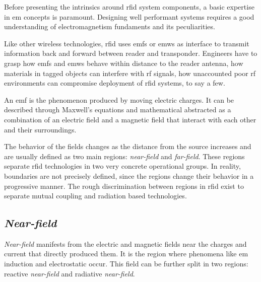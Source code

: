 
Before presenting the intrinsics around \ac{rfid} system components, a basic expertise in \ac{em} concepts is paramount.
Designing well performant systems requires a good understanding of electromagnetism fundaments and its peculiarities.

Like other wireless technologies, \ac{rfid} uses \acp{emf} or \acp{emw} as interface to transmit information back and forward between reader and transponder.
Engineers have to grasp how \acp{emf} and \acp{emw} behave within distance to the reader antenna, how materials in tagged objects can interfere with \ac{rf} signals, how unaccounted poor \ac{rf} environments can compromise deployment of \ac{rfid} systems, to say a few.

An \ac{emf} is the phenomenon produced by moving electric charges. It can be described through Maxwell's equations and mathematical abstracted as a combination of an electric field and a magnetic field that interact with each other and their surroundings.

The behavior of the fields changes as the distance from the source increases and are usually defined as two main regions: \emph{near-field} and \emph{far-field}. These regions separate \ac{rfid} technologies in two very concrete operational groups. In reality, boundaries are not precisely defined, since the regions change their behavior in a progressive manner. The rough discrimination between regions in \ac{rfid} exist to separate mutual coupling and radiation based technologies. 

\subsection{\emph{Near-field}}

\emph{Near-field} manifests from the electric and magnetic fields near the charges and current that directly produced them. It is the region where phenomena like \ac{em} induction and electrostatic occur.
This field can be further split in two regions: reactive \emph{near-field} and radiative \emph{near-field}.


